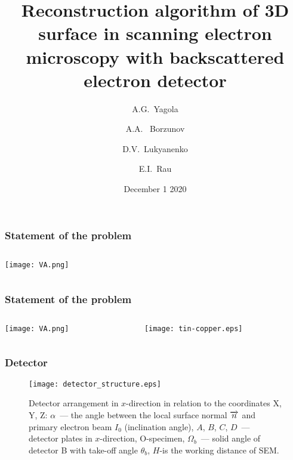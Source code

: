 \documentclass{beamer}
\title[3D surface reconstruction in SEM BE]{Reconstruction algorithm of 3D
    surface in scanning electron microscopy with backscattered electron
    detector}
\author[A.G.~Yagola]{A.G.~Yagola \inst{1} \and A.A.~ Borzunov \inst{1}
    \and D.V.~Lukyanenko \inst{1} \and E.I.~Rau \inst{1}}
\institute[Lomonosov MSU]{\inst{1}Lomonosov Moscow State University}
\date{December 1 2020}
\begin{document}
\begin{frame}
    \titlepage
\end{frame}

\begin{frame}
    \frametitle{Statement of the problem}
    \begin{columns}
        \begin{column}{0.5\textwidth}
            \texttt{[image: VA.png]}
        \end{column}
        \begin{column}{0.5\textwidth}
        \end{column}
    \end{columns}
\end{frame}

\begin{frame}
    \frametitle{Statement of the problem}
    \begin{columns}
        \begin{column}{0.38\textwidth}
            \texttt{[image: VA.png]}
        \end{column}
        \begin{column}{0.58\textwidth}
            \texttt{[image: tin-copper.eps]}
        \end{column}
    \end{columns}
\end{frame}

\begin{frame}
    \frametitle{Detector}
    \begin{figure}
        \texttt{[image: detector\_structure.eps]}
        \caption{Detector arrangement in $x$-direction in relation to the coordinates X, Y, Z:
        \@ $\alpha$~--- the angle between the local surface normal $\protect\overrightarrow{n}$
        and primary electron beam $I_0$ (inclination angle), $A$, $B$, $C$, $D$~--- detector
        plates in $x$-direction, O-specimen, $\Omega_{b}$~--- solid angle of detector B with
        take-off angle $\theta_b$, $H$-is the working distance of SEM.}
        {\label{fig:detector_structure}}%
    \end{figure}
\end{frame}
\end{document}
